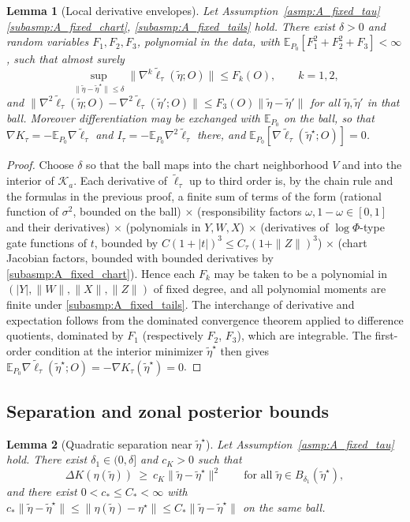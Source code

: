 \documentclass[11pt]{article}
\newtheorem{lemma}{Lemma}
\theoremstyle{definition}
\theoremstyle{plain}
\newcommand{\E}{\mathbb{E}}
\begin{document}
\begin{lemma}[Local derivative envelopes]
\label{lem:score_hess_envelopes_fixed_tau_new}
Let Assumption~\ref{asmp:A_fixed_tau}\ref{subasmp:A_fixed_chart}, \ref{subasmp:A_fixed_tails} hold. There exist $\delta>0$ and random variables $F_1,F_2,F_3$, polynomial in the data, with $\E_{P_0}[F_1^2+F_2^2+F_3]<\infty$, such that almost surely
\[
\sup_{\|\tilde\eta-\tilde\eta^\star\|\le\delta}\|\nabla^k\tilde\ell_\tau(\tilde\eta;O)\|\le F_k(O),\qquad k=1,2,
\]
and $\|\nabla^2\tilde\ell_\tau(\tilde\eta;O)-\nabla^2\tilde\ell_\tau(\tilde\eta';O)\|\le F_3(O)\|\tilde\eta-\tilde\eta'\|$ for all $\tilde\eta,\tilde\eta'$ in that ball. Moreover differentiation may be exchanged with $\E_{P_0}$ on the ball, so that
$\nabla K_\tau=-\E_{P_0}\nabla\tilde\ell_\tau$ and $I_\tau=-\E_{P_0}\nabla^2\tilde\ell_\tau$ there, and $\E_{P_0}[\nabla\tilde\ell_\tau(\tilde\eta^\star;O)]=0$.
\end{lemma}

\begin{proof}
Choose $\delta$ so that the ball maps into the chart neighborhood $V$ and into the interior of $\mathcal K_a$. Each derivative of $\tilde\ell_\tau$ up to third order is, by the chain rule and the formulas in the previous proof, a finite sum of terms of the form (rational function of $\sigma^2$, bounded on the ball) $\times$ (responsibility factors $\omega,1-\omega\in[0,1]$ and their derivatives) $\times$ (polynomials in $Y,W,X$) $\times$ (derivatives of $\log\Phi$-type gate functions of $t$, bounded by $C(1+|t|)^3\le C_\tau(1+\|Z\|)^3$) $\times$ (chart Jacobian factors, bounded with bounded derivatives by \ref{subasmp:A_fixed_chart}). Hence each $F_k$ may be taken to be a polynomial in $(|Y|,\|W\|,\|X\|,\|Z\|)$ of fixed degree, and all polynomial moments are finite under \ref{subasmp:A_fixed_tails}. The interchange of derivative and expectation follows from the dominated convergence theorem applied to difference quotients, dominated by $F_1$ (respectively $F_2$, $F_3$), which are integrable. The first-order condition at the interior minimizer $\tilde\eta^\star$ then gives $\E_{P_0}\nabla\tilde\ell_\tau(\tilde\eta^\star;O)=-\nabla K_\tau(\tilde\eta^\star)=0$.
\end{proof}

\subsection{Separation and zonal posterior bounds}

\begin{lemma}[Quadratic separation near $\tilde\eta^\star$]
\label{lem:derived_separation_fixed_tau_new}
Let Assumption~\ref{asmp:A_fixed_tau} hold. There exist $\delta_1\in(0,\delta]$ and $c_K>0$ such that
\[
\Delta K(\eta(\tilde\eta))\ \ge\ c_K\|\tilde\eta-\tilde\eta^\star\|^2
\qquad\text{for all }\tilde\eta\in B_{\delta_1}(\tilde\eta^\star),
\]
and there exist $0<c_\ast\le C_\ast<\infty$ with
$c_\ast\|\tilde\eta-\tilde\eta^\star\|\le\|\eta(\tilde\eta)-\eta^\star\|\le C_\ast\|\tilde\eta-\tilde\eta^\star\|$ on the same ball.
\end{lemma}
\end{document}
